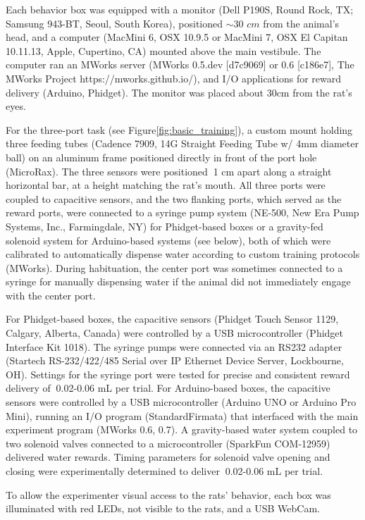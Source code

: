 Each behavior box was equipped with a monitor (Dell P190S, Round Rock, TX; Samsung 943-BT, Seoul, South Korea), positioned $\sim$30 $cm$ from the animal's head, and a computer (MacMini 6, OSX 10.9.5 or MacMini 7, OSX El Capitan 10.11.13, Apple, Cupertino, CA) mounted above the main vestibule. The computer ran an MWorks server (MWorks 0.5.dev [d7c9069] or 0.6 [c186e7], The MWorks Project https://mworks.github.io/), and I/O applications for reward delivery (Arduino\textregistered, Phidget). The monitor was placed about 30cm from the rat's eyes. 

For the three-port task (see Figure\ref{fig:basic_training}), a custom mount holding three feeding tubes (Cadence 7909, 14G Straight Feeding Tube w/ 4mm diameter ball) on an aluminum frame positioned directly in front of the port hole (MicroRax). The three sensors were positioned $~$1 cm apart along a straight horizontal bar, at a height matching the rat's mouth. All three ports were coupled to capacitive sensors, and the two flanking ports, which served as the reward ports, were connected to a syringe pump system (NE-500, New Era Pump Systems, Inc., Farmingdale, NY) for Phidget-based boxes or a gravity-fed solenoid system for Arduino-based systems (see below), both of which were calibrated to automatically dispense water according to custom training protocols (MWorks). During habituation, the center port was sometimes connected to a syringe for manually dispensing water if the animal did not immediately engage with the center port. 

For Phidget-based boxes, the capacitive sensors (Phidget Touch Sensor 1129, Calgary, Alberta, Canada) were controlled by a USB microcontroller (Phidget Interface Kit 1018). The syringe pumps were connected via an RS232 adapter (Startech RS-232/422/485 Serial over IP Ethernet Device Server, Lockbourne, OH). Settings for the syringe port were tested for precise and consistent reward delivery of $~$0.02-0.06 mL per trial. For Arduino-based boxes, the capacitive sensors were controlled by a USB microcontroller (Arduino UNO or Arduino Pro Mini), running an I/O program (StandardFirmata) that interfaced with the main experiment program (MWorks 0.6, 0.7). A gravity-based water system coupled to two solenoid valves connected to a microcontroller (SparkFun COM-12959) delivered water rewards. Timing parameters for solenoid valve opening and closing were experimentally determined to deliver $~$0.02-0.06 mL per trial. 

To allow the experimenter visual access to the rats' behavior, each box was illuminated with red LEDs, not visible to the rats, and a USB WebCam. 

